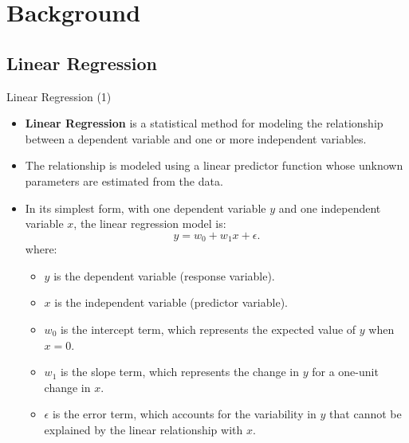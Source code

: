 \documentclass[10pt, hyperref={colorlinks = true,linkcolor = blue}]{beamer}
\begin{document}
{\section{Background}
{\subsection{Linear Regression}

\begin{frame}{Linear Regression (1) }
 \begin{itemize}
    \item \textbf{Linear Regression} is a statistical method for modeling the relationship between a dependent variable and one or more independent variables.
    \item The relationship is modeled using a linear predictor function whose unknown parameters are estimated from the data.
    \item In its simplest form, with one dependent variable \(y\) and one independent variable \(x\), the linear regression model is:
    \[
    y = w_0 + w_1 x + \epsilon.
    \]
    where:
    \begin{itemize}
        \item \(y\) is the dependent variable (response variable).
        \item \(x\) is the independent variable (predictor variable).
        \item \(w_0\) is the intercept term, which represents the expected value of \(y\) when \(x = 0\).
        \item \(w_1\) is the slope term, which represents the change in \(y\) for a one-unit change in \(x\).
        \item \(\epsilon\) is the error term, which accounts for the variability in \(y\) that cannot be explained by the linear relationship with \(x\).
    \end{itemize}
    \end{itemize}
\end{frame}


}}
\end{document}
